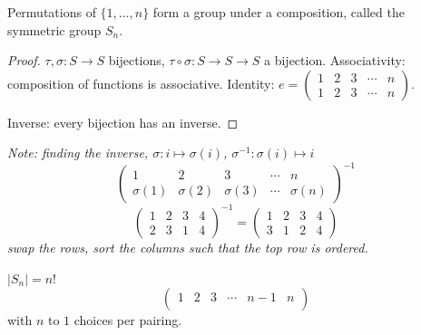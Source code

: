 \documentclass[10pt, a4paper]{article}
\begin{document}
\begin{proposition}
    Permutations of $\{1, \dotsc, n\}$ form a group under a composition,
    called the symmetric group $S_n$.

    \begin{proof}
        $\tau, \sigma : S \to S$ bijections,
        $\tau \circ \sigma : S \to S \to S$ a bijection.
        Associativity:
        composition of functions is associative.
        Identity:
        $e = \begin{pmatrix}
            1 & 2 & 3 & \dotsi & n \\
            1 & 2 & 3 & \dotsi & n
        \end{pmatrix}$.

        Inverse:
        every bijection has an inverse.
    \end{proof}
\end{proposition}

\textit{Note:
finding the inverse,
$\sigma : i \mapsto \sigma(i)$,
$\sigma ^ {-1} : \sigma(i) \mapsto i$}
\[
\begin{pmatrix}
    1 & 2 & 3 & \dotsi & n \\
    \sigma(1) & \sigma(2) & \sigma(3) & \dotsi & \sigma(n)
\end{pmatrix} ^ {-1}
\]
\[
\begin{pmatrix}
    1 & 2 & 3 & 4 \\
    2 & 3 & 1 & 4
\end{pmatrix} ^ {-1} = \begin{pmatrix}
    1 & 2 & 3 & 4 \\
    3 & 1 & 2 & 4
\end{pmatrix}
\]
\textit{swap the rows,
sort the columns such that the top row is ordered.}

\begin{remark}
    $|S_n| = n!$
    \[
    \begin{pmatrix}
        1 & 2 & 3 & \dotsi & n - 1 & n \\
        \phantom{}
    \end{pmatrix}
    \]
    with $n$ to $1$ choices per pairing.
\end{remark}
\end{document}

